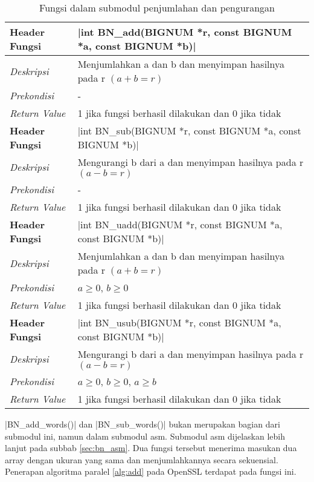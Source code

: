   \begin{table}[!h]
    \caption{Fungsi dalam submodul penjumlahan dan pengurangan}
    \label{tab:bn_add_func}
    \begin{tabular}{R{2.8cm}L{10.5cm}}
      \toprule
      \textbf{Header Fungsi} & |int BN_add(BIGNUM *r, const BIGNUM *a, const BIGNUM *b)|    \\ \midrule
      \textit{Deskripsi}     & Menjumlahkan a dan b dan menyimpan hasilnya pada r $(a+b=r)$ \\
      \textit{Prekondisi}    & -                                                            \\
      \textit{Return Value}  & 1 jika fungsi berhasil dilakukan dan 0 jika tidak
      \\ \bottomrule
      \textbf{Header Fungsi} & |int BN_sub(BIGNUM *r, const BIGNUM *a, const BIGNUM *b)|    \\ \midrule
      \textit{Deskripsi}     & Mengurangi b dari a dan menyimpan hasilnya pada r $(a-b=r)$  \\
      \textit{Prekondisi}    & -                                                            \\
      \textit{Return Value}  & 1 jika fungsi berhasil dilakukan dan 0 jika tidak
      \\ \bottomrule
      \textbf{Header Fungsi} & |int BN_uadd(BIGNUM *r, const BIGNUM *a, const BIGNUM *b)|   \\ \midrule
      \textit{Deskripsi}     & Menjumlahkan a dan b dan menyimpan hasilnya pada r $(a+b=r)$ \\
      \textit{Prekondisi}    & $a \geq 0$, $ b \geq 0$                                      \\
      \textit{Return Value}  & 1 jika fungsi berhasil dilakukan dan 0 jika tidak
      \\ \bottomrule
      \textbf{Header Fungsi} & |int BN_usub(BIGNUM *r, const BIGNUM *a, const BIGNUM *b)|   \\ \midrule
      \textit{Deskripsi}     & Mengurangi b dari a dan menyimpan hasilnya pada r $(a-b=r)$  \\
      \textit{Prekondisi}    & $a \geq 0$, $b \geq 0$, $a \geq b$                           \\
      \textit{Return Value}  & 1 jika fungsi berhasil dilakukan dan 0 jika tidak
      \\ \bottomrule
    \end{tabular}
  \end{table}

  |BN_add_words()| dan |BN_sub_words()| bukan merupakan bagian dari submodul ini, namun dalam submodul asm. Submodul asm dijelaskan lebih lanjut pada subbab \ref{sec:bn_asm}. Dua fungsi tersebut menerima masukan dua array dengan ukuran yang sama dan menjumlahkannya secara sekuensial. Penerapan algoritma paralel \ref{alg:add} pada OpenSSL terdapat pada fungsi ini.
